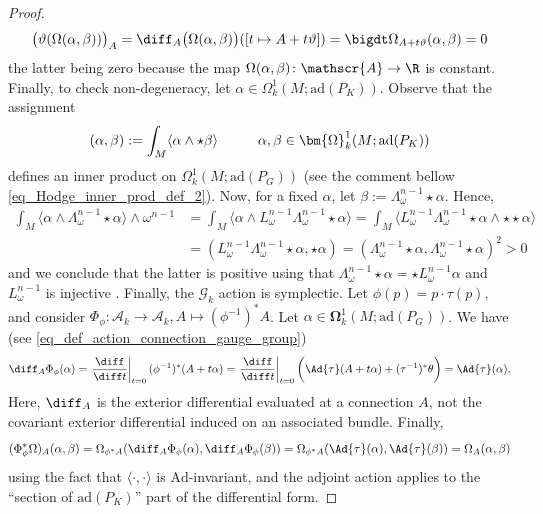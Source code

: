 {\begin{proof}
    \[
    \big(\vartheta(\Omega(\alpha, \beta))\big)_A=\diff_A \big(\Omega(\alpha, \beta)\big)([t \mapsto A+ t\vartheta])=\bigdt \Omega_{A+t\vartheta}(\alpha, \beta)=0
    \] 
    the latter being zero because the map \(\Omega(\alpha, \beta)\colon \mathscr{A}\to \R\) is constant. Finally, to check non-degeneracy, let \(\alpha \in \Omega^1_k(M;\mathrm{ad}(P_K))\). Observe that the assignment 
    \[
    (\alpha, \beta):=\int_M \langle \alpha \wedge \star \beta \rangle \hspace{1 cm} \alpha, \beta \in \bm{\Omega}^1_k(M; \mathrm{ad}(P_K))
    \]
    defines an inner product on \(\Omega^1_k(M; \mathrm{ad}(P_G))\) (see the comment bellow \eqref{eq_Hodge_inner_prod_def_2}). Now, for a fixed \(\alpha\), let \(\beta:=\Lambda_\omega^{n-1} \star\alpha\). Hence,
    \begin{align*}
        \int_M \langle \alpha \wedge \Lambda_\omega^{n-1} \star \alpha \rangle \wedge \omega^{n-1} & = \int_M \langle \alpha \wedge  L_\omega ^{n-1} \Lambda_\omega^{n-1} \star \alpha \rangle = \int_M \langle L_\omega ^{n-1} \Lambda_\omega^{n-1} \star \alpha \wedge \star \star \alpha \rangle \\
        & = (L_\omega^{n-1} \Lambda_\omega^{n-1} \star \alpha , \star \alpha) = (\Lambda_\omega^{n-1} \star\alpha,\Lambda_\omega^{n-1} \star\alpha)^2>0  
    \end{align*}
    and we conclude that the latter is positive using that \(\Lambda_\omega^{n-1} \star\alpha=\star L_\omega^{n-1} \alpha\) and \(L_\omega^{n-1}\) is injective \parencite[Lemma 9.39]{lee_introCM}. Finally, the \(\mathscr{G}_k\) action is symplectic. Let \(\phi(p)=p\cdot \tau(p)\), and consider \(\Phi_\phi\colon \mathscr{A}_k \to \mathscr{A}_k, A \mapsto (\phi^{-1})^*A\). Let \(\alpha \in \bm{\Omega}^1_k(M; \mathrm{ad}(P_G))\). We have (see \eqref{eq_def_action_connection_gauge_group})
    \[
    \diff_A \Phi_\phi(\alpha)=\left. \frac{\diff}{\diff t}\right|_{t=0} (\phi^{-1})^*(A+t\alpha)=\left. \frac{\diff}{\diff t}\right|_{t=0} \bigg( \Ad{\tau}(A+t \alpha) + (\tau^{-1})^*\theta \bigg) = \Ad{\tau} (\alpha).
    \]
    Here, \(\diff_A\) is the exterior differential evaluated at a connection \(A\), not the covariant exterior differential induced on an associated bundle. Finally, 
    \[(\Phi_\phi^* \Omega)_A(\alpha, \beta)=\Omega_{\phi^*A}(\diff_A \Phi_\phi(\alpha), \diff_A \Phi_\phi(\beta))=\Omega_{\phi^*A}(\Ad{\tau}(\alpha), \Ad{\tau}(\beta))=\Omega_A(\alpha, \beta)
    \] 
    using the fact that \(\langle \cdot, \cdot \rangle\) is \(\mathrm{Ad}\)-invariant, and the adjoint action applies to the ``section of \(\mathrm{ad}(P_K)\)'' part of the differential form.

\end{proof}}
